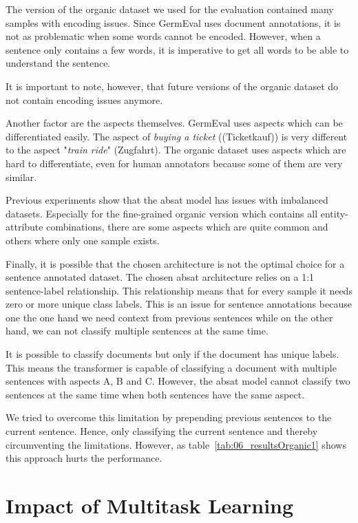 The version of the organic dataset we used for the evaluation contained many samples with encoding issues. Since GermEval uses document annotations, it is not as problematic when some words cannot be encoded. However, when a sentence only contains a few words, it is imperative to get all words to be able to understand the sentence. 

It is important to note, however, that future versions of the organic dataset do not contain encoding issues anymore.
\medskip

Another factor are the aspects themselves. GermEval uses aspects which can be differentiated easily. The aspect of \textit{buying a ticket} {((Ticketkauf))} is very different to the aspect "\textit{train ride}" {(Zugfahrt)}. The organic dataset uses aspects which are hard to differentiate, even for human annotators because some of them are very similar.
\medskip

Previous experiments show that the \gls{absat} model has issues with imbalanced datasets. Especially for the fine-grained organic version which contains all entity-attribute combinations, there are some aspects which are quite common and others where only one sample exists.
\medskip

Finally, it is possible that the chosen architecture is not the optimal choice for a sentence annotated dataset. The chosen \gls{absat} architecture relies on a 1:1 sentence-label relationship. This relationship means that for every sample it needs zero or more unique class labels. This is an issue for sentence annotations because one the one hand we need context from previous sentences while on the other hand, we can not classify multiple sentences at the same time.
\smallskip

It is possible to classify documents but only if the document has unique labels. This means the transformer is capable of classifying a document with multiple sentences with aspects A, B and C. However, the \gls{absat} model cannot classify two sentences at the same time when both sentences have the same aspect.
\medskip

We tried to overcome this limitation by prepending previous sentences to the current sentence. Hence, only classifying the current sentence and thereby circumventing the limitations. However, as table~\ref{tab:06_resultsOrganic1} shows this approach hurts the performance.
\section{Impact of Multitask Learning}
\label{sec:06_ResultsMultitask}

